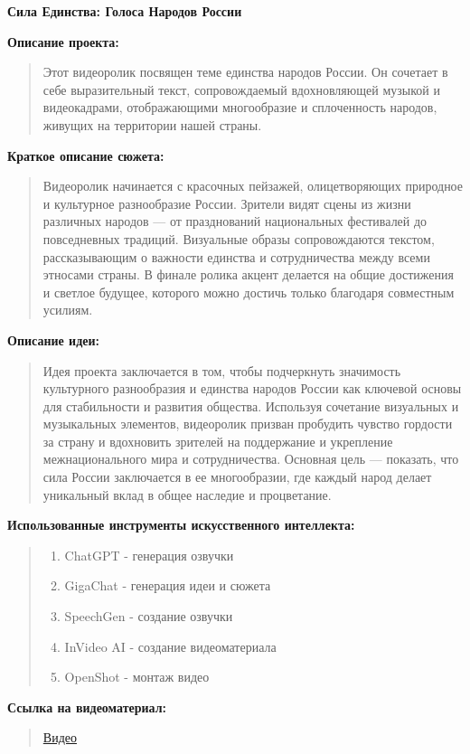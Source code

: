 \documentclass{article}
\begin{document}
\setlength{\parindent}{0pt}

\begin{Large}
    \textsf{\textbf{Сила Единства: Голоса Народов России}}
\end{Large}

\vspace{1cm}

\textsf{\textbf{Описание проекта:}}

\begin{quote}
    Этот видеоролик посвящен теме единства народов России. Он сочетает в себе выразительный текст, сопровождаемый вдохновляющей музыкой и видеокадрами, отображающими многообразие и сплоченность народов, живущих на территории нашей страны. 
\end{quote}

\textbf{\textsf{Краткое описание сюжета:}}

\begin{quote}
Видеоролик начинается с красочных пейзажей, олицетворяющих природное и культурное разнообразие России. Зрители видят сцены из жизни различных народов — от празднований национальных фестивалей до повседневных традиций. Визуальные образы сопровождаются текстом, рассказывающим о важности единства и сотрудничества между всеми этносами страны. В финале ролика акцент делается на общие достижения и светлое будущее, которого можно достичь только благодаря совместным усилиям.
\end{quote}

\textbf{\textsf{Описание идеи:}}

\begin{quote}
Идея проекта заключается в том, чтобы подчеркнуть значимость культурного разнообразия и единства народов России как ключевой основы для стабильности и развития общества. Используя сочетание визуальных и музыкальных элементов, видеоролик призван пробудить чувство гордости за страну и вдохновить зрителей на поддержание и укрепление межнационального мира и сотрудничества. Основная цель — показать, что сила России заключается в ее многообразии, где каждый народ делает уникальный вклад в общее наследие и процветание.    
\end{quote}

\textbf{\textsf{Использованные инструменты искусственного интеллекта:}}

\begin{quote}
    \begin{enumerate}
        \item ChatGPT - генерация озвучки
        \item GigaChat - генерация идеи и сюжета
        \item SpeechGen - создание озвучки
        \item InVideo AI - создание видеоматериала
        \item OpenShot - монтаж видео
    \end{enumerate}
\end{quote}

\textbf{\textsf{Ссылка на видеоматериал:}}

\begin{quote}
  \href{https://disk.yandex.ru/i/piVhEClUViA7tg}{Видео} 
\end{quote}
\end{document}
